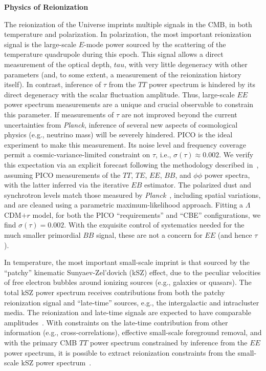 \documentclass[PICOReport.tex]{subfiles}
\begin{document}

{\bf Physics of Reionization}

The reionization of the Universe imprints multiple signals in the CMB, in both temperature and polarization.  In polarization, the most important reionization signal is the large-scale $E$-mode power sourced by the scattering of the temperature quadrupole during this epoch.  This signal allows a direct measurement of the optical depth, $tau$, with very little degeneracy with other parameters (and, to some extent, a measurement of the reionization history itself).  In contrast, inference of $\tau$ from the $TT$ power spectrum is hindered by its direct degeneracy with the scalar fluctuation amplitude.  Thus, large-scale $EE$ power spectrum measurements are a unique and crucial observable to constrain this parameter.  If measurements of $\tau$ are not improved beyond the current uncertainties from {\em Planck}, inference of several new aspects of cosmological physics (e.g., neutrino mass) will be severely hindered.  PICO is the ideal experiment to make this measurement.  Its noise level and frequency coverage permit a cosmic-variance-limited constraint on $\tau$, i.e., $\sigma(\tau) \approx 0.002$.  We verify this expectation via an explicit forecast following the methodology described in~\citet{ErrardFeeney2016}, assuming PICO measurements of the $TT$, $TE$, $EE$, $BB$, and $\phi\phi$ power spectra, with the latter inferred via the iterative $EB$ estimator.  The polarized dust and synchrotron levels match those measured by {\em Planck}~\citep{PlanckFG2015}, including spatial variations, and are cleaned using a parametric maximum-likelihood approach.  Fitting a $\Lambda$CDM$+r$ model, for both the PICO ``requirements'' and ``CBE'' configurations, we find $\sigma(\tau) = 0.002$.  With the exquisite control of systematics needed for the much smaller primordial $BB$ signal, these are not a concern for $EE$ (and hence $\tau$).

In temperature, the most important small-scale imprint is that sourced by the ``patchy'' kinematic Sunyaev-Zel'dovich (kSZ) effect, due to the peculiar velocities of free electron bubbles around ionizing sources (e.g., galaxies or quasars).  The total kSZ power spectrum receives contributions from both the patchy reionization signal and ``late-time'' sources, e.g., the intergalactic and intracluster media.  The reionization and late-time signals are expected to have comparable amplitudes~\citep{Shaw2012,MMS2012,Battaglia2013}.  With constraints on the late-time contribution from other information (e.g., cross-correlations), effective small-scale foreground removal, and with the primary CMB $TT$ power spectrum constrained by inference from the $EE$ power spectrum, it is possible to extract reionization constraints from the small-scale kSZ power spectrum~\citep{calabrese/etal/2014}.
\end{document}
